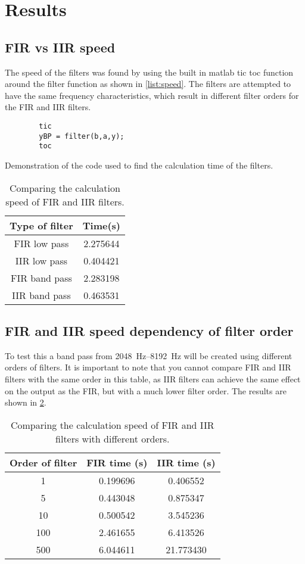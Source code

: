 
\section{Results}

\subsection{FIR vs IIR speed}
The speed of the filters was found by using the built in matlab tic toc function around the filter function as shown in \cref{list:speed}. The filters are attempted to have the same frequency characteristics, which result in different filter orders for the FIR and IIR filters.

\begin{listing}
	\begin{verbatim}
		tic
		yBP = filter(b,a,y);
		toc
	\end{verbatim}
	\caption{Demonstration of the code used to find the calculation time of the filters.}
	\label{list:speed}
\end{listing}

\begin{table}[!htb]
	\centering
	\caption{Comparing the calculation speed of FIR and IIR filters.}
	\label{tab:speed}
	\begin{tabular}{cc}
		Type of filter & Time(\si{\second}) \\
		\midrule
		FIR low pass & \num{2.275644}\\
		IIR low pass & \num{0.404421}\\
		FIR band pass & \num{2.283198}\\
		IIR band pass & \num{0.463531}
	\end{tabular}
\end{table}

\subsection{FIR and IIR speed dependency of filter order}
To test this a band pass from \SIrange{2048}{8192}{\hertz} will be created using different orders of filters. It is important to note that you cannot compare FIR and IIR filters with the same order in this table, as IIR filters can achieve the same effect on the output as the FIR, but with a much lower filter order. The results are shown in \cref{tab:order_speed}.
\begin{table}[!htb]
	\centering
	\caption{Comparing the calculation speed of FIR and IIR filters with different orders.}
	\label{tab:order_speed}
	\begin{tabular}{ccc}
		Order of filter & FIR time (\si{\second}) & IIR time (\si{\second}) \\
		\midrule
		1		&	\num{0.199696} & \num{0.406552}\\
		5		& \num{0.443048} & \num{0.875347} \\
		10		& \num{0.500542}	 & \num{3.545236}\\
		100		& \num{2.461655}	 & \num{6.413526} \\
		500		& \num{6.044611}	 & \num{21.773430} \\
	\end{tabular}
\end{table}
